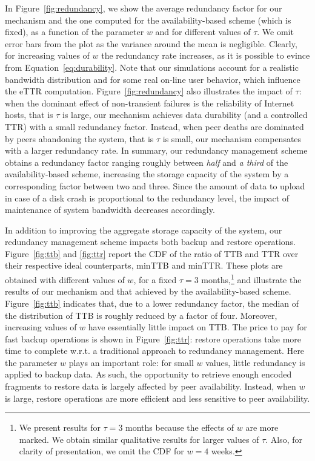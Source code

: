 In Figure~\ref{fig:redundancy}, we show the average redundancy factor
for our mechanism and the one computed for the availability-based
scheme (which is fixed), as a function of the parameter $w$ and for
different values of $\tau$. We omit error bars from the plot as the
variance around the mean is negligible. Clearly, for increasing values
of $w$ the redundancy rate increases, as it is possible to evince from
Equation~\ref{eq:durability}. Note that our simulations account for a
realistic bandwidth distribution and for some real on-line user
behavior, which influence the eTTR
computation. Figure~\ref{fig:redundancy} also illustrates the impact of
$\tau$: when the dominant effect of non-transient failures is the
reliability of Internet hosts, that is $\tau$ is large, our mechanism
achieves data durability (and a controlled TTR) with a small
redundancy factor. Instead, when peer deaths are dominated by peers
abandoning the system, that is $\tau$ is small, our mechanism
compensates with a larger redundancy rate. In summary, our redundancy
management scheme obtains a redundancy factor ranging roughly between
\emph{half} and \emph{a third} of the availability-based scheme,
increasing the storage capacity of the system by a corresponding
factor between two and three. Since the amount of data to upload in
case of a disk crash is proportional to the redundancy level, the
impact of maintenance of system bandwidth decreases accordingly.

In addition to improving the aggregate storage capacity of the system,
our redundancy management scheme impacts both backup and restore
operations. Figure~\ref{fig:ttb} and \ref{fig:ttr} report the CDF of the
ratio of TTB and TTR over their respective ideal counterparts,
minTTB and minTTR. These plots are obtained with different values
of $w$, for a fixed $\tau=3$ months,\footnote{We present results for
$\tau=3$ months because the effects of $w$ are more marked. We obtain
similar qualitative results for larger values of $\tau$. Also, for
clarity of presentation, we omit the CDF for $w=4$ weeks.} and
illustrate the results of our mechanism and that achieved by the
availability-based scheme. Figure~\ref{fig:ttb} indicates that, due to a
lower redundancy factor, the median of the distribution of TTB is
roughly reduced by a factor of four. Moreover, increasing values of
$w$ have essentially little impact on TTB. The price to pay for fast
backup operations is shown in Figure~\ref{fig:ttr}: restore operations
take more time to complete w.r.t. a traditional approach to redundancy
management. Here the parameter $w$ plays an important role: for small
$w$ values, little redundancy is applied to backup data. As such, the
opportunity to retrieve enough encoded fragments to restore data is
largely affected by peer availability. Instead, when $w$ is large,
restore operations are more efficient and less sensitive to peer
availability.

